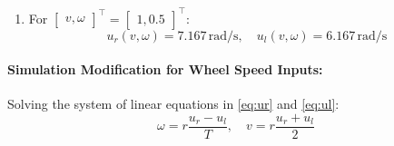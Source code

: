 \begin{enumerate}[label=\textbf{(\alph*)}]
\begin{enumerate}[label=\arabic*.]
        \item For $\begin{bmatrix} v, \omega \end{bmatrix}^\top = \begin{bmatrix} 1, 0.5 \end{bmatrix}^\top$:
        \begin{equation*}
            u_r(v, \omega) = 7.167\,\text{rad/s}, \quad u_l(v, \omega) = 6.167\,\text{rad/s}
        \end{equation*}
    \end{enumerate}

    \paragraph{Simulation Modification for Wheel Speed Inputs:}
    Solving the system of linear equations in \eqref{eq:ur} and \eqref{eq:ul}:
    \begin{equation}
        \omega = r\frac{u_r - u_l}{T}, \quad v = r\frac{u_r + u_l}{2}
    \end{equation}


\end{enumerate}
